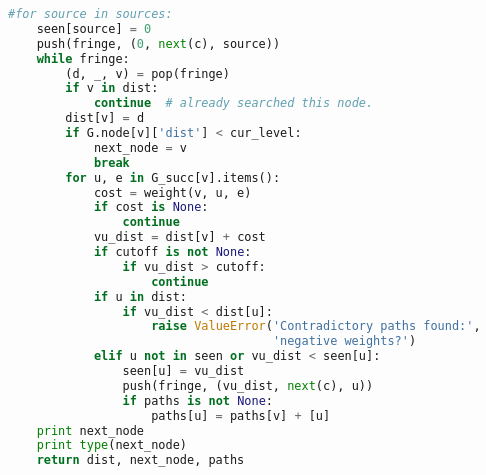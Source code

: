 \begin{lstlisting}[language=Python]
    #for source in sources:
    seen[source] = 0
    push(fringe, (0, next(c), source))
    while fringe:
        (d, _, v) = pop(fringe)
        if v in dist:
            continue  # already searched this node.
        dist[v] = d
        if G.node[v]['dist'] < cur_level:
            next_node = v
            break
        for u, e in G_succ[v].items():
            cost = weight(v, u, e)
            if cost is None:
                continue
            vu_dist = dist[v] + cost
            if cutoff is not None:
                if vu_dist > cutoff:
                    continue
            if u in dist:
                if vu_dist < dist[u]:
                    raise ValueError('Contradictory paths found:',
                                     'negative weights?')
            elif u not in seen or vu_dist < seen[u]:
                seen[u] = vu_dist
                push(fringe, (vu_dist, next(c), u))
                if paths is not None:
                    paths[u] = paths[v] + [u]
    print next_node
    print type(next_node)
    return dist, next_node, paths
\end{lstlisting}